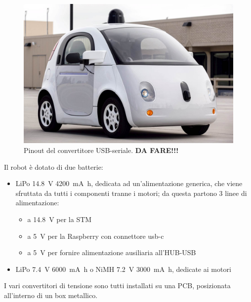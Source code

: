 \begin{figure}
	\centering    
	\includegraphics[height=0.2\textheight]{charlie_adulto.jpeg}
	\caption{Pinout del convertitore USB-seriale. \textbf{DA FARE!!!}}
	\label{fig: pinout usbserial}
\end{figure}


Il robot è dotato di due batterie:
\begin{itemize}
	\item LiPo \SI{14.8}{\volt} \SI{4200}{\milli \ampere \hour}, dedicata ad un’alimentazione generica, che viene sfruttata da tutti i componenti tranne i motori; da questa partono 3 linee di alimentazione: 
	\begin{itemize}
		\item a \SI{14.8}{\volt} per la STM
		\item a \SI{5}{\volt} per la Raspberry con connettore usb-c
		\item a \SI{5}{\volt} per fornire alimentazione ausiliaria all’HUB-USB
	\end{itemize}
	\item LiPo \SI{7.4}{\volt} \SI{6000}{\milli \ampere \hour} o NiMH \SI{7.2}{\volt} \SI{3000}{\milli \ampere \hour}, dedicate ai motori
\end{itemize}

I vari convertitori di tensione sono tutti installati su una PCB, posizionata all’interno di un box metallico.

